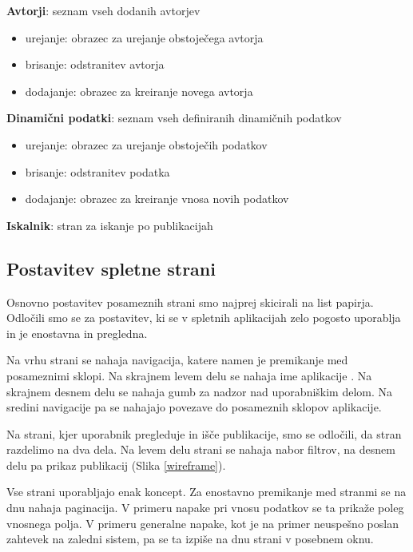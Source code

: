 \documentclass[a4paper, 12pt]{book}
\begin{document}
\begin{description}
		\item \textbf{Avtorji}: seznam vseh dodanih avtorjev
		\begin{itemize}
		    \item urejanje: obrazec za urejanje obstoječega avtorja
		    \item brisanje: odstranitev avtorja
		    \item dodajanje: obrazec za kreiranje novega avtorja
		\end{itemize}
		
		\item \textbf{Dinamični podatki}: seznam vseh definiranih dinamičnih podatkov
		\begin{itemize}
		    \item urejanje: obrazec za urejanje obstoječih podatkov
		    \item brisanje: odstranitev podatka
		    \item dodajanje: obrazec za kreiranje vnosa novih podatkov
		\end{itemize}
		
		\item \textbf{Iskalnik}: stran za iskanje po publikacijah
\end{description}

\subsection{Postavitev spletne strani}
Osnovno postavitev posameznih strani smo najprej skicirali na list papirja. Odločili smo se za postavitev, ki se v spletnih aplikacijah zelo pogosto uporablja in je enostavna in pregledna.

Na vrhu strani se nahaja navigacija, katere namen je premikanje med posameznimi sklopi. Na skrajnem levem delu se nahaja ime aplikacije . Na skrajnem desnem delu se nahaja gumb za nadzor nad uporabniškim delom. Na sredini navigacije pa se nahajajo povezave do posameznih sklopov aplikacije.

Na strani, kjer uporabnik pregleduje in išče publikacije, smo se odločili, da stran razdelimo na dva dela. Na levem delu strani se nahaja nabor filtrov, na desnem delu pa prikaz publikacij (Slika \ref{wireframe}). 

Vse strani uporabljajo enak koncept. Za enostavno premikanje med stranmi se na dnu nahaja paginacija. V primeru napake pri vnosu podatkov se ta prikaže poleg vnosnega polja. V primeru generalne napake, kot je na primer neuspešno poslan zahtevek na zaledni sistem, pa se ta izpiše na dnu strani v posebnem oknu.
\end{document}

